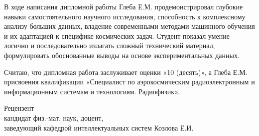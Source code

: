 \documentclass[14pt, a4paper]{bsu_review}
\begin{document}
В ходе написания дипломной работы Глеба Е.М. продемонстрировал глубокие навыки самостоятельного научного исследования, способность к комплексному анализу больших данных, владение современными методами машинного обучения и их адаптацией к специфике космических задач. Студент показал умение логично и последовательно излагать сложный технический материал, формулировать обоснованные выводы на основе экспериментальных данных.

Считаю, что дипломная работа заслуживает оценки «10 (десять)», а Глеба Е.М. присвоения квалификации «Специалист по аэрокосмическим радиоэлектронным и информационным системам и технологиям. Радиофизик».

\vspace{1cm}

\noindent Рецензент\\
кандидат физ.-мат. наук, доцент, \\
заведующий кафедрой интеллектуальных систем \hfill Козлова Е.И.
\end{document}
